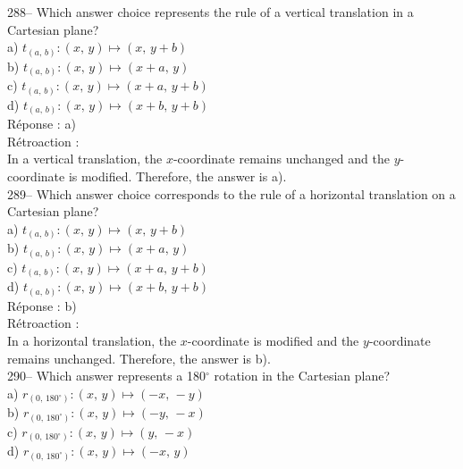 \documentclass[letterpaper, 12pt]{article}
\begin{document}
288-- Which answer choice represents the rule of a vertical
translation in a Cartesian plane?\\

a) $t_{\left( a,\,b\right) } :\left(x,\,y\right)\longmapsto
\left(x,\,y+b\right) $\\
b) $t_{\left( a,\,b\right) } :\left(x,\,y\right)\longmapsto
\left(x+a,\,y\right) $\\
c) $t_{\left( a,\,b\right) } :\left(x,\,y\right)\longmapsto
\left(x+a,\,y+b\right) $\\
d) $t_{\left( a,\,b\right) } :\left(x,\,y\right)\longmapsto
\left(x+b,\,y+b\right) $\\

R\'eponse : a)\\

R\'etroaction :\\
In a vertical translation, the $x$-coordinate remains unchanged and
the $y$-coordinate is modified.
Therefore, the answer is a).\\

289-- Which answer choice corresponds to the rule of a horizontal
translation on a Cartesian plane?\\

a) $t_{\left( a,\,b\right) } :\left(x,\,y\right)\longmapsto
\left(x,\,y+b\right) $\\
b) $t_{\left( a,\,b\right) } :\left(x,\,y\right)\longmapsto
\left(x+a,\,y\right) $\\
c) $t_{\left( a,\,b\right) } :\left(x,\,y\right)\longmapsto
\left(x+a,\,y+b\right) $\\
d) $t_{\left( a,\,b\right) } :\left(x,\,y\right)\longmapsto
\left(x+b,\,y+b\right) $\\

R\'eponse : b)\\

R\'etroaction :\\
In a horizontal translation, the $x$-coordinate is modified and the
$y$-coordinate remains unchanged. Therefore, the answer is b).\\

290-- Which answer represents a 180$^{\circ}$ rotation in the Cartesian plane?\\

a) $r_{\left( 0,\,180^{\circ}\right) } :\left( x,\,y\right)
\longmapsto
\left(-x,\,-y\right) $ \\
b) $r_{\left( 0,\,180^{\circ}\right) } :\left( x,\,y\right)
\longmapsto
\left(-y,\,-x\right) $ \\
c) $r_{\left( 0,\,180^{\circ}\right) } :\left( x,\,y\right)
\longmapsto
\left(y,\,-x\right) $\\
d) $r_{\left( 0,\,180^{\circ}\right) } :\left( x,\,y\right)
\longmapsto
\left(-x,\,y\right) $\\
\end{document}
